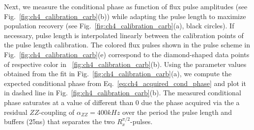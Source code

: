 Next, we measure the conditional phase as function of flux pulse amplitudes (see Fig.~\ref{fig:ch4_calibration_carb}(b)) while adapting the pulse length to maximize population recovery (see Fig.~\ref{fig:ch4_calibration_carb}(a), black circles). If necessary, pulse length is interpolated linearly between the calibration points of the pulse length calibration. The colored flux pulses shown in the pulse scheme in Fig.~\ref{fig:ch4_calibration_carb}(e) correspond to the diamond-shaped data points of respective color in ~\ref{fig:ch4_calibration_carb}(b). Using the parameter values obtained from the fit in Fig.~\ref{fig:ch4_calibration_carb}(a), we compute the expected conditional phase from  Eq.~\eqref{eq:ch4_acquired_cond_phase} and plot it in dashed line in Fig.~\ref{fig:ch4_calibration_carb}(b). The measured conditional phase saturates at a value of different than 0 due the phase acquired via the a residual $ZZ$-coupling of $\alpha_{ZZ} = 400\unit{kHz}$ over the period the pulse length and buffers (25ns) that separates the two $R_x^{\pi/2}$-pulses. 

